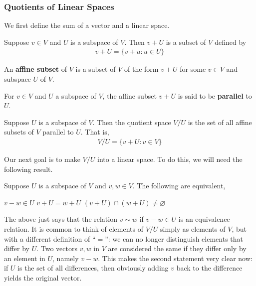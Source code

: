 \documentclass{article}
\begin{document}
\subsubsection{Quotients of Linear Spaces}
  We first define the sum of a vector and a linear space.
  \begin{defn}
    Suppose $v \in V$ and $U$ is a subspace of $V$. Then $v + U$ is a subset of $V$ defined by
    \begin{align*}
      v + U = \{v + u: u \in U\}
    \end{align*}
  \end{defn}
  \begin{defn}
    An \textbf{affine subset} of $V$ is a subset of $V$ of the form $v + U$ for some $v \in V$ and subspace $U$ of $V$.
  \end{defn}
  \begin{defn}
    For $v \in V$ and $U$ a subspace of $V$, the affine subset $v + U$ is said to be \textbf{parallel} to $U$.
  \end{defn}
  \begin{defn}
    Suppose $U$ is a subspace of $V$. Then the quotient space $V/U$ is the set of all affine subsets of $V$ parallel to $U$. That is,
    \begin{align*}
      V/U = \{v + U: v \in V\}
    \end{align*}
  \end{defn}
  Our next goal is to make $V/U$ into a linear space. To do this, we will need the following result.
  \begin{prop}\label{prop:quotient_space_properties}
    Suppose $U$ is a subspace of $V$ and $v, w \in V$. The following are equivalent,
    \begin{enumerate}[label=\alph*)]
      \ii $v - w \in U$
      \ii $v + U = w + U$
      \ii $(v + U)\cap(w + U) \neq \varnothing$
    \end{enumerate}
    The above just says that the relation $v \sim w$ if $v - w \in U$ is an equivalence relation. It is common to think of elements of $V/U$ simply as elements of $V$, but with a different
    definition of “$=$”: we can no longer distinguish elements that differ by $U$. Two vectors $v, w$ in $V$ are considered the same if they differ only by an element in $U$, namely $v - w$.
    This makes the second statement very clear now: if $U$ is the set of all differences, then obviously adding $v$ back to the difference yields the original vector. 
  \end{prop}
\end{document}
